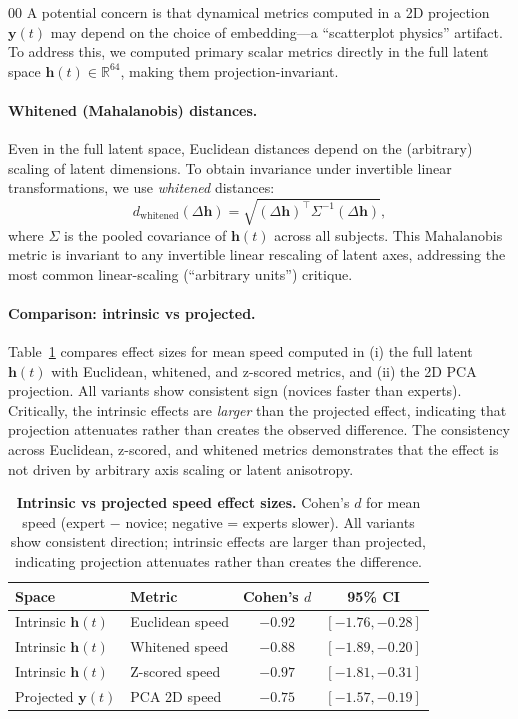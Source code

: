 \documentclass[5p,twocolumn,authoryear]{elsarticle}
\begin{document}
\begin{thebibliography}{00}
A potential concern is that dynamical metrics computed in a 2D projection $\mathbf{y}(t)$ may depend on the choice of embedding---a ``scatterplot physics'' artifact. To address this, we computed primary scalar metrics directly in the full latent space $\mathbf{h}(t) \in \mathbb{R}^{64}$, making them projection-invariant.

\paragraph{Whitened (Mahalanobis) distances.}
Even in the full latent space, Euclidean distances depend on the (arbitrary) scaling of latent dimensions. To obtain invariance under invertible linear transformations, we use \emph{whitened} distances:
\begin{equation}
d_{\mathrm{whitened}}(\Delta\mathbf{h}) = \sqrt{(\Delta\mathbf{h})^\top \Sigma^{-1} (\Delta\mathbf{h})},
\end{equation}
where $\Sigma$ is the pooled covariance of $\mathbf{h}(t)$ across all subjects. This Mahalanobis metric is invariant to any invertible linear rescaling of latent axes, addressing the most common linear-scaling (``arbitrary units'') critique.

\paragraph{Comparison: intrinsic vs projected.}
Table~\ref{tab:intrinsic_vs_projected} compares effect sizes for mean speed computed in (i) the full latent $\mathbf{h}(t)$ with Euclidean, whitened, and z-scored metrics, and (ii) the 2D PCA projection. All variants show consistent sign (novices faster than experts). Critically, the intrinsic effects are \emph{larger} than the projected effect, indicating that projection attenuates rather than creates the observed difference. The consistency across Euclidean, z-scored, and whitened metrics demonstrates that the effect is not driven by arbitrary axis scaling or latent anisotropy.

\begin{table}[h]
\centering
\caption{\textbf{Intrinsic vs projected speed effect sizes.} Cohen's $d$ for mean speed (expert $-$ novice; negative = experts slower). All variants show consistent direction; intrinsic effects are larger than projected, indicating projection attenuates rather than creates the difference.}
\label{tab:intrinsic_vs_projected}
\begin{tabular}{llcc}
\toprule
Space & Metric & Cohen's $d$ & 95\% CI \\
\midrule
Intrinsic $\mathbf{h}(t)$ & Euclidean speed & $-0.92$ & $[-1.76, -0.28]$ \\
Intrinsic $\mathbf{h}(t)$ & Whitened speed & $-0.88$ & $[-1.89, -0.20]$ \\
Intrinsic $\mathbf{h}(t)$ & Z-scored speed & $-0.97$ & $[-1.81, -0.31]$ \\
Projected $\mathbf{y}(t)$ & PCA 2D speed & $-0.75$ & $[-1.57, -0.19]$ \\
\bottomrule
\end{tabular}
\end{table}


\end{thebibliography}
\end{document}
